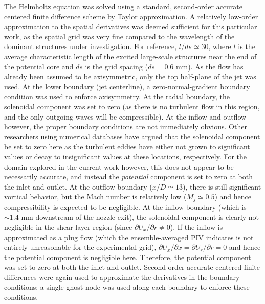 The Helmholtz equation was solved using a standard, second-order accurate centered finite difference scheme by Taylor approximation.
A relatively low-order approximation to the spatial derivatives was deemed sufficient for this particular work, as the spatial grid was very fine compared to the wavelength of the dominant structures under investigation.
For reference, $l/ds \simeq 30$, where $l$ is the average characteristic length of the excited large-scale structures near the end of the potential core and $ds$ is the grid spacing ($ds = 0.6$ mm).
As the flow has already been assumed to be axisymmetric, only the top half-plane of the jet was used.
At the lower boundary (jet centerline), a zero-normal-gradient boundary condition was used to enforce axisymmetry.
At the radial boundary, the solenoidal component was set to zero (as there is no turbulent flow in this region, and the only outgoing waves will be compressible).
At the inflow and outflow however, the proper boundary conditions are not immediately obvious.
Other researchers using numerical databases \citep{Unnikrishnan2015} have argued that the solenoidal component be set to zero here as the turbulent eddies have either not grown to significant values or decay to insignificant values at these locations, respectively.
For the domain explored in the current work however, this does not appear to be necessarily accurate, and instead the \textit{potential} component is set to zero at both the inlet and outlet.
At the outflow boundary ($x/D \simeq 13$), there is still significant vortical behavior, but the Mach number is relatively low ($M_j \simeq 0.5$) and hence compressibility is expected to be negligible.
At the inflow boundary (which is $\sim1.4$ mm downstream of the nozzle exit), the solenoidal component is clearly not negligible in the shear layer region (since $\partial U_x / \partial r \neq 0$).
If the inflow is approximated as a plug flow (which the ensemble-averaged PIV indicates is not entirely unreasonable for the experimental grid), $\partial U_x / \partial x = \partial U_r / \partial r = 0$ and hence the potential component is negligible here.
Therefore, the potential component was set to zero at both the inlet and outlet.
Second-order accurate centered finite differences were again used to approximate the derivatives in the boundary conditions; a single ghost node was used along each boundary to enforce these conditions.

